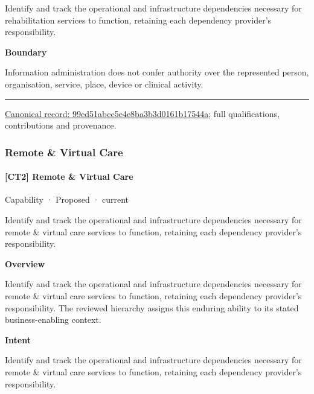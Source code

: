 Identify and track the operational and infrastructure dependencies necessary for rehabilitation services to function, retaining each dependency provider's responsibility.



\textbf{Boundary}



Information administration does not confer authority over the represented person, organisation, service, place, device or clinical activity.



\medskip\hrule\medskip

{\footnotesize \href{../../../../continuum/strategy/capability/99ed51abcc5e4e8ba3b3d0161b17544a.md}{Canonical record: 99ed51abcc5e4e8ba3b3d0161b17544a}; full qualifications, contributions and provenance.}\par
\subsubsection{Remote \& Virtual Care}

\paragraph{[CT2] Remote \& Virtual Care}

\label{element:30dff22d40b64da29ede7c41673db085}
{\small Capability · Proposed · current}\par

Identify and track the operational and infrastructure dependencies necessary for remote \& virtual care services to function, retaining each dependency provider's responsibility.



\textbf{Overview}



Identify and track the operational and infrastructure dependencies necessary for remote \& virtual care services to function, retaining each dependency provider's responsibility. The reviewed hierarchy assigns this enduring ability to its stated business-enabling context.



\textbf{Intent}



Identify and track the operational and infrastructure dependencies necessary for remote \& virtual care services to function, retaining each dependency provider's responsibility.



